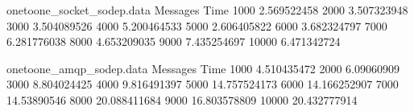 \begin{filecontents}{onetoone_socket_sodep.data}
Messages Time
1000  2.569522458
2000  3.507323948
3000  3.504089526
4000  5.200464533
5000  2.606405822
6000  3.682324797
7000  6.281776038
8000  4.653209035
9000  7.435254697
10000 6.471342724
\end{filecontents}

\begin{filecontents}{onetoone_amqp_sodep.data}
Messages Time
1000  4.510435472
2000  6.09060909
3000  8.804024425
4000  9.816491397
5000  14.757524173
6000  14.166252907
7000  14.53890546
8000  20.088411684
9000  16.803578809
10000 20.432777914
\end{filecontents}

